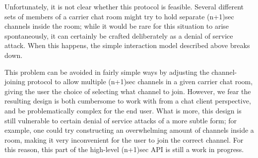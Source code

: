 \documentclass{article}
\begin{document}
Unfortunately, it is not clear whether this protocol is feasible.
Several different sets of members of a carrier chat room might try to hold separate (n+1)sec channels inside the room; while it would be rare for this situation to arise spontaneously, it can certainly be crafted deliberately as a denial of service attack.
When this happens, the simple interaction model described above breaks down.

This problem can be avoided in fairly simple ways by adjusting the channel-joining protocol to allow multiple (n+1)sec channels in a given carrier chat room, giving the user the choice of selecting what channel to join.
However, we fear the resulting design is both cumbersome to work with from a chat client perspective, and be problematically complex for the end user.
What is more, this design is still vulnerable to certain denial of service attacks of a more subtle form; for example, one could try constructing an overwhelming amount of channels inside a room, making it very inconvenient for the user to join the correct channel.
For this reason, this part of the high-level (n+1)sec API is still a work in progress.
\end{document}
